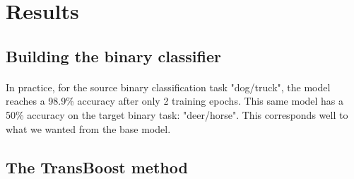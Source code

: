 \documentclass[11 pt]{article}
\begin{document}
\section{Results}

\subsection{Building the binary classifier}

\paragraph{} In practice, for the source binary classification task "dog/truck", the model reaches a 98.9\% accuracy after only 2 training epochs. This same model has a 50\% accuracy on the target binary task: "deer/horse". This corresponds well to what we wanted from the base model.

\subsection{The TransBoost method}

\end{document}
